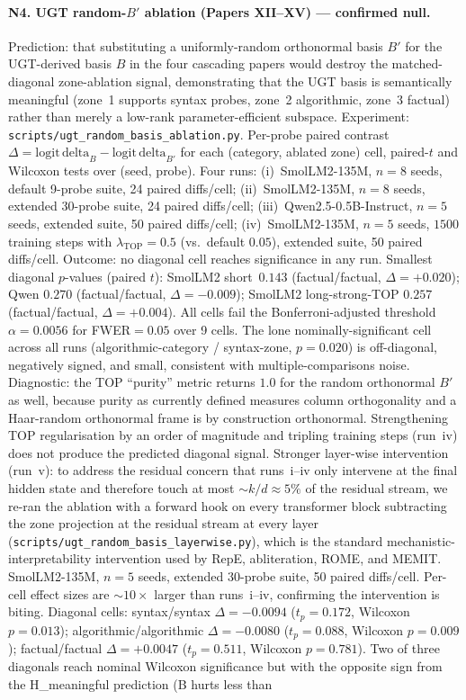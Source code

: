 \documentclass[11pt]{article}
\begin{document}
\paragraph{N4. UGT random-$B'$ ablation (Papers XII--XV) --- confirmed null.} Prediction: that substituting a uniformly-random orthonormal basis $B'$ for the UGT-derived basis $B$ in the four cascading papers would destroy the matched-diagonal zone-ablation signal, demonstrating that the UGT basis is semantically meaningful (zone~1 supports syntax probes, zone~2 algorithmic, zone~3 factual) rather than merely a low-rank parameter-efficient subspace. Experiment: \texttt{scripts/ugt\_random\_basis\_ablation.py}. Per-probe paired contrast $\Delta = \mathrm{logit\,delta}_B - \mathrm{logit\,delta}_{B'}$ for each (category, ablated zone) cell, paired-$t$ and Wilcoxon tests over (seed, probe). Four runs: (i)~SmolLM2-135M, $n{=}8$ seeds, default 9-probe suite, 24 paired diffs/cell; (ii)~SmolLM2-135M, $n{=}8$ seeds, extended 30-probe suite, 24 paired diffs/cell; (iii)~Qwen2.5-0.5B-Instruct, $n{=}5$ seeds, extended suite, 50 paired diffs/cell; (iv)~SmolLM2-135M, $n{=}5$ seeds, $1500$ training steps with $\lambda_{\mathrm{TOP}}=0.5$ (vs.\ default $0.05$), extended suite, 50 paired diffs/cell. Outcome: no diagonal cell reaches significance in any run. Smallest diagonal $p$-values (paired $t$): SmolLM2 short~$0.143$ (factual/factual, $\Delta{=}{+}0.020$); Qwen $0.270$ (factual/factual, $\Delta{=}{-}0.009$); SmolLM2 long-strong-TOP $0.257$ (factual/factual, $\Delta{=}{+}0.004$). All cells fail the Bonferroni-adjusted threshold $\alpha{=}0.0056$ for FWER$=0.05$ over 9 cells. The lone nominally-significant cell across all runs (algorithmic-category / syntax-zone, $p{=}0.020$) is off-diagonal, negatively signed, and small, consistent with multiple-comparisons noise. Diagnostic: the TOP ``purity'' metric returns $1.0$ for the random orthonormal $B'$ as well, because purity as currently defined measures column orthogonality and a Haar-random orthonormal frame is by construction orthonormal. Strengthening TOP regularisation by an order of magnitude and tripling training steps (run~iv) does not produce the predicted diagonal signal. Stronger layer-wise intervention (run~v): to address the residual concern that runs~i--iv only intervene at the final hidden state and therefore touch at most ${\sim}k/d \approx 5\%$ of the residual stream, we re-ran the ablation with a forward hook on every transformer block subtracting the zone projection at the residual stream at every layer (\texttt{scripts/ugt\_random\_basis\_layerwise.py}), which is the standard mechanistic-interpretability intervention used by RepE, abliteration, ROME, and MEMIT. SmolLM2-135M, $n{=}5$ seeds, extended 30-probe suite, 50 paired diffs/cell. Per-cell effect sizes are ${\sim}10\times$ larger than runs~i--iv, confirming the intervention is biting. Diagonal cells: syntax/syntax $\Delta{=}{-}0.0094$ ($t_p{=}0.172$, Wilcoxon $p{=}0.013$); algorithmic/algorithmic $\Delta{=}{-}0.0080$ ($t_p{=}0.088$, Wilcoxon $p{=}0.009$); factual/factual $\Delta{=}{+}0.0047$ ($t_p{=}0.511$, Wilcoxon $p{=}0.781$). Two of three diagonals reach nominal Wilcoxon significance but with the opposite sign from the H\_meaningful prediction (B hurts less than 
\end{document}
